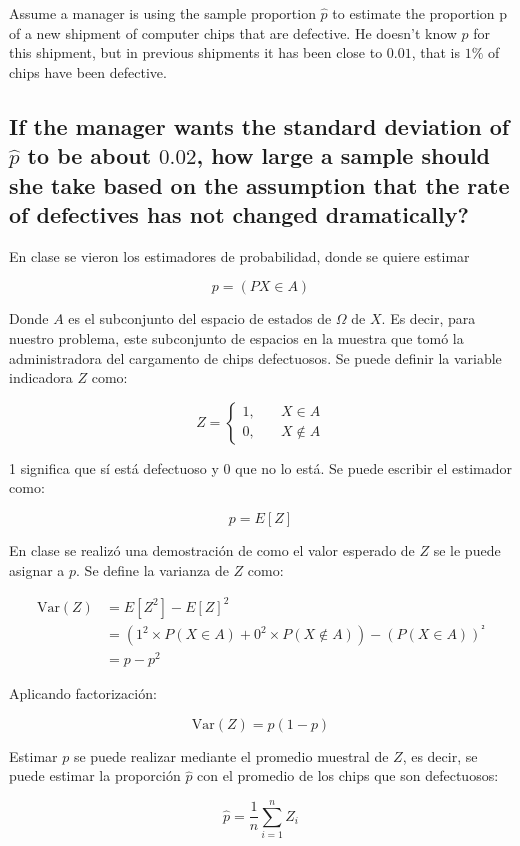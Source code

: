 \documentclass[12pt]{article}\usepackage[]{graphicx}\usepackage[]{xcolor}
\begin{document}
Assume a manager is using the sample proportion $\hat{p}$ to estimate the proportion p of a new shipment of computer chips that are defective. He doesn’t know $p$ for this shipment, but in previous shipments it has been close to $0.01$, that is $1 \% $ of chips have been defective.

\subsection{If the manager wants the standard deviation of $\hat{p}$ to be about $0.02$, how large a sample should she take based on the assumption that the rate of defectives has not changed dramatically?}

En clase se vieron los estimadores de probabilidad, donde se quiere estimar

\[
  p = (P X \in A)
\]

Donde \(A\) es el subconjunto del espacio de estados de \(\Omega \) de \(X\). Es decir, para nuestro problema, este subconjunto de espacios en la muestra que tomó la administradora del cargamento de chips defectuosos. Se puede definir la variable indicadora \(Z\) como:

\[
  Z = 
  \begin{cases}
    1, & \quad X \in A \\
    0, & \quad X \notin A
  \end{cases}
\]

1 significa que sí está defectuoso y 0 que no lo está. Se puede escribir el estimador como:

\[
p = E[Z]
\]

En clase se realizó una demostración de como el valor esperado de \(Z\) se le puede asignar a \(p\). Se define la varianza de \(Z\) como:

\begin{align*}
\mathrm{Var}(Z) &= E[Z^{2}] - E[Z]^{2} \\
  &= (1^{2} \times P(X \in A) + 0^{2} \times P (X \notin A)) - (P(X \in A))^{²} \\
  &= p - p^{2}
\end{align*}

Aplicando factorización:

\[
\mathrm{Var}(Z) = p (1 - p)
\]

Estimar $p$ se puede realizar mediante el promedio muestral de $Z$, es decir, se puede estimar la proporción $\hat{p}$ con el promedio de los chips que son defectuosos:

\[
\hat{p} = \frac{1}{n} \sum_{i =1}^{n} Z_{i}
\]
\end{document}
